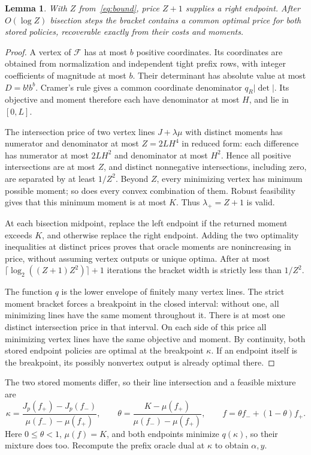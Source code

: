 \documentclass[manuscript,11pt,screen,nonacm]{acmart}
\newtheorem{lemma}[theorem]{Lemma}
\newcommand{\Q}{\mathcal F}
\begin{document}
\begin{lemma}\label{lem:isolation}
With $Z$ from~\eqref{eq:bound}, price $Z+1$ supplies a right endpoint.
After $O(\log Z)$ bisection steps the bracket contains a common optimal
price for both stored policies, recoverable exactly from their costs and
moments.
\end{lemma}
\begin{proof}
A vertex of $\Q$ has at most $b$ positive coordinates. Its coordinates
are obtained from normalization and independent tight prefix rows, with
integer coefficients of magnitude at most $b$. Their determinant has
absolute value at most $D=b!b^b$. Cramer's rule gives a common coordinate
denominator $q_R|\det|$. Its objective and moment therefore each have
denominator at most $H$, and lie in $[0,L]$.

The intersection price of two vertex lines $J+\lambda\mu$ with distinct
moments has numerator and denominator at most $Z=2LH^4$ in reduced form:
each difference has numerator at most $2LH^2$ and denominator at most
$H^2$. Hence all positive intersections are at most $Z$, and distinct
nonnegative intersections, including zero, are separated by at least
$1/Z^2$. Beyond $Z$, every minimizing vertex has minimum possible moment;
so does every convex combination of them. Robust feasibility gives that
this minimum moment is at most $K$. Thus $\lambda_+=Z+1$ is valid.

At each bisection midpoint, replace the left endpoint if the returned
moment exceeds $K$, and otherwise replace the right endpoint. Adding the
two optimality inequalities at distinct prices proves that oracle moments
are nonincreasing in price, without assuming vertex outputs or unique
optima. After at most
$\lceil\log_2((Z+1)Z^2)\rceil+1$ iterations the bracket width is strictly
less than $1/Z^2$.

The function $q$ is the lower envelope of finitely many vertex lines.
The strict moment bracket forces a breakpoint in the closed interval:
without one, all minimizing lines have the same moment throughout it.
There is at most one distinct intersection price in that interval.
On each side of this price all minimizing vertex lines have the same
objective and moment. By continuity, both stored endpoint policies are
optimal at the breakpoint $\kappa$. If an endpoint itself is the breakpoint,
its possibly nonvertex output is already optimal there. 
\end{proof}

The two stored moments differ, so their line intersection and a feasible
mixture are
\begin{equation}\label{eq:recover}
 \kappa=\frac{J_p(f_+)-J_p(f_-)}{\mu(f_-)-\mu(f_+)},\qquad
 \theta=\frac{K-\mu(f_+)}{\mu(f_-)-\mu(f_+)},\qquad
 f=\theta f_-+(1-\theta)f_+.
\end{equation}
Here $0\le\theta<1$, $\mu(f)=K$, and both endpoints minimize
$q(\kappa)$, so their mixture does too. Recompute the prefix oracle dual
at $\kappa$ to obtain $\alpha,y$.
\end{document}
